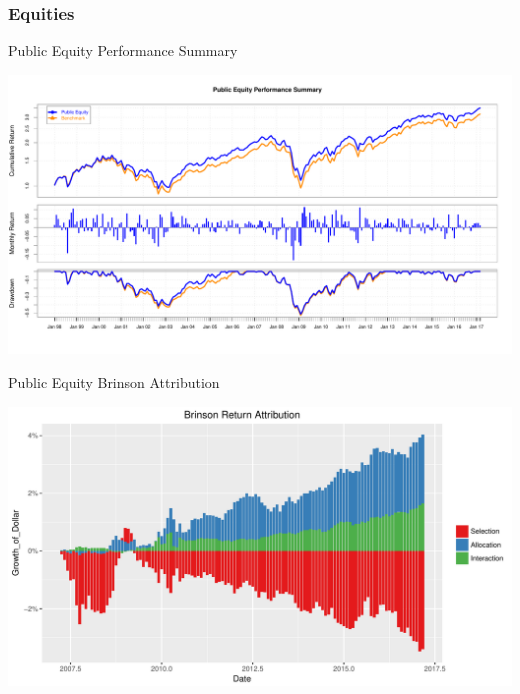 \documentclass[10pt,english]{beamer}\usepackage[]{graphicx}\usepackage[]{color}
\makeatletter
\def\maxwidth{ %
  \ifdim\Gin@nat@width>\linewidth
    \linewidth
  \else
    \Gin@nat@width
  \fi
}
\newenvironment{knitrout}{}{} %
\makeatother
\begin{document}
\subsubsection{Equities}
\begin{frame}[fragile]{Public Equity Performance Summary}

\begin{knitrout}
\color{fgcolor}
\includegraphics[width=\maxwidth]{figure/equities-1} 

\end{knitrout}
\end{frame}
%
\begin{frame}[fragile]{Public Equity Brinson Attribution}

\begin{knitrout}
\color{fgcolor}
\includegraphics[width=\maxwidth]{figure/eq_attribution-1} 

\end{knitrout}
\end{frame}
%
\end{document}
